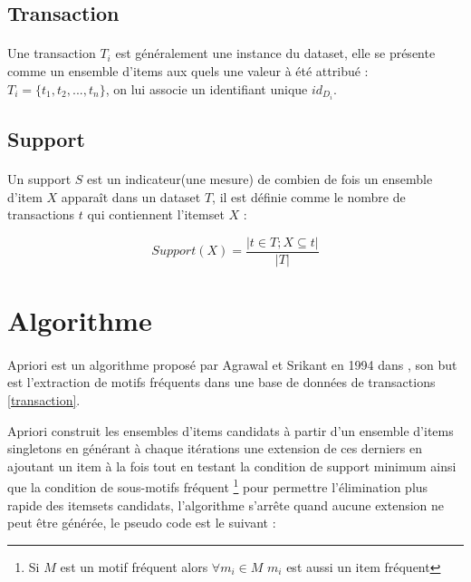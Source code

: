 		\subsection*{Transaction}\label{transaction}
			\paragraph{}
			Une transaction $T_i$ est généralement une instance du dataset, elle se présente comme un ensemble d'items aux quels une valeur à été attribué : 
			$T_i = \lbrace t_1,t_2,...,t_n\rbrace$, on lui associe un identifiant unique $id_{D_i}$.
		
		\subsection*{Support}
			\paragraph{}
			Un support $S$ est un indicateur(une mesure) de combien de fois un ensemble d'item $X$ apparaît dans un dataset $T$, il est définie comme le nombre de transactions $t$ qui contiennent l'itemset $X$ : 
		
			\begin{equation*}
				Support(X) = \frac{|t \in T ; X \subseteq t|}{|T|}
			\end{equation*}
		
	\section{Algorithme}
		\paragraph{}
		Apriori est un algorithme proposé par Agrawal et Srikant en 1994 dans \cite{Agrawal:1994:FAM:645920.672836}, son but est l'extraction de motifs fréquents dans une base de données de transactions \ref{transaction}.
		\par Apriori construit les ensembles d'items candidats à partir d'un ensemble d'items singletons en générant à chaque itérations une extension de ces derniers en ajoutant un item à la fois tout en testant la condition de support minimum ainsi que la condition de sous-motifs fréquent \footnote{Si $M$ est un motif fréquent alors $\forall m_i \in M $ $m_i$ est aussi un item fréquent} pour permettre l'élimination plus rapide des itemsets candidats, l'algorithme s'arrête quand aucune extension ne peut être générée, le pseudo code est le suivant :
		
